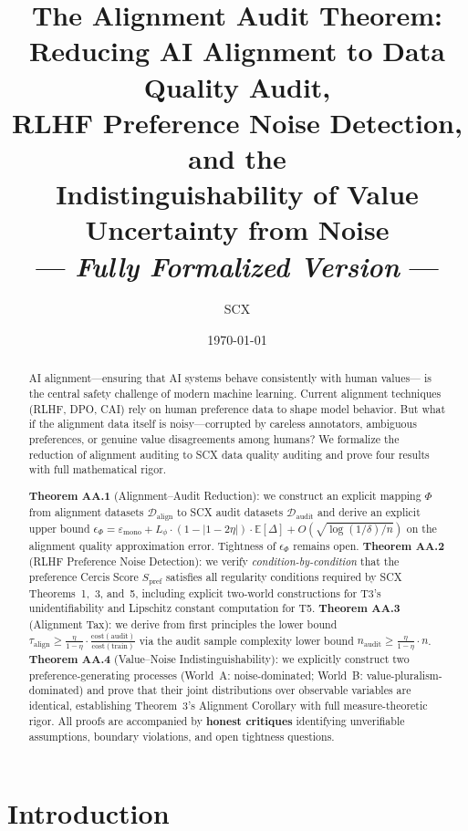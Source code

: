 \documentclass[12pt,a4paper]{article}
\title{\bfseries The Alignment Audit Theorem:\\
Reducing AI Alignment to Data Quality Audit,\\
RLHF Preference Noise Detection, and the\\
Indistinguishability of Value Uncertainty from Noise\\
--- \emph{Fully Formalized Version} ---}
\author{SCX}
\date{\today}
\newcommand{\E}{\mathbb{E}}
\newcommand{\cD}{\mathcal{D}}
\begin{document}
\maketitle

\begin{abstract}
AI alignment---ensuring that AI systems behave consistently with human values---
is the central safety challenge of modern machine learning.  Current alignment
techniques (RLHF, DPO, CAI) rely on human preference data to shape model
behavior.  But what if the alignment data itself is noisy---corrupted by
careless annotators, ambiguous preferences, or genuine value disagreements
among humans?  We formalize the reduction of alignment auditing to \textsf{SCX} data
quality auditing and prove four results with full mathematical rigor.

\textbf{Theorem AA.1} (Alignment--Audit Reduction): we construct an explicit
mapping $\Phi$ from alignment datasets $\cD_{\mathrm{align}}$ to \textsf{SCX} audit
datasets $\cD_{\mathrm{audit}}$ and derive an explicit upper bound
$\epsilon_\Phi = \varepsilon_{\mathrm{mono}} + L_\phi \cdot (1-|1-2\eta|)
\cdot \E[\Delta] + O(\sqrt{\log(1/\delta)/n})$ on the alignment
quality approximation error.  Tightness of $\epsilon_\Phi$ remains open.
\textbf{Theorem AA.2} (RLHF Preference Noise Detection): we verify
\emph{condition-by-condition} that the preference Cercis Score
$S_{\mathrm{pref}}$ satisfies all regularity conditions required by \textsf{SCX}
Theorems~1,~3, and~5, including explicit two-world constructions for T3's
unidentifiability and Lipschitz constant computation for T5.
\textbf{Theorem AA.3} (Alignment Tax): we derive from first principles the
lower bound $\tau_{\mathrm{align}} \geq \frac{\eta}{1-\eta}\cdot
\frac{\mathrm{cost}(\mathrm{audit})}{\mathrm{cost}(\mathrm{train})}$ via the
audit sample complexity lower bound $n_{\mathrm{audit}} \geq
\frac{\eta}{1-\eta}\cdot n$.  \textbf{Theorem AA.4} (Value--Noise
Indistinguishability): we explicitly construct two preference-generating
processes (World~A: noise-dominated; World~B: value-pluralism-dominated) and
prove that their joint distributions over observable variables are identical,
establishing Theorem~3's Alignment Corollary with full measure-theoretic
rigor.  All proofs are accompanied by \textbf{honest critiques} identifying
unverifiable assumptions, boundary violations, and open tightness questions.
\end{abstract}

\section{Introduction}
\end{document}
